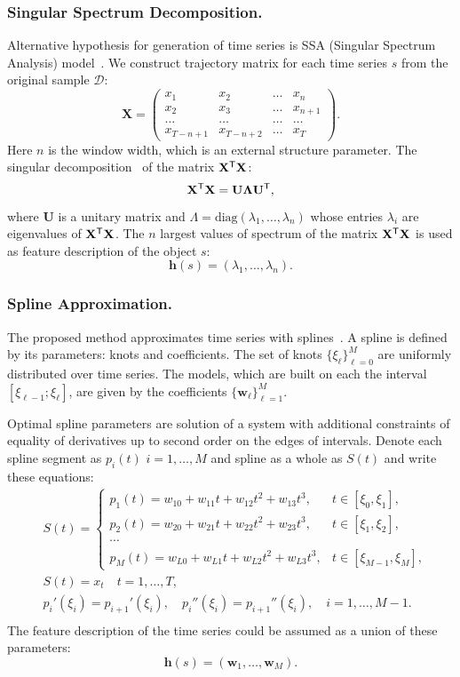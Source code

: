 \documentclass{llncs}
\newcommand{\T}{{\mbox{\scriptsize\sffamily\upshape\mdseries T}}}
\begin{document}
\subsubsection{Singular Spectrum Decomposition.}
Alternative hypothesis for generation of time series is SSA (Singular Spectrum Analysis) model~\cite{hassani2007singular}. We construct trajectory matrix for each time series $s$ from the original sample $\mathcal{D}$:
\[
\mathbf{X} = 
\begin{pmatrix}
x_1 & x_2 & \dots & x_n \\
x_2 & x_3 & \dots & x_{n+1} \\
\dots & \dots & \dots & \dots \\
x_{T-n+1} & x_{T-n+2} & \dots & x_T
\end{pmatrix}.
\]
Here $n$ is the window width, which is an external structure parameter.
The singular decomposition~\cite{golub1970singular} of the matrix $\mathbf{X}^{\T} \mathbf{X}$:
\[
\mathbf{X}^{\T} \mathbf{X} = \mathbf{U} \mathbf{\Lambda} \mathbf{U}^{\T},
\]
where $\mathbf{U}$ is a unitary matrix and $\Lambda = \mathrm{diag}(\lambda_1, \dots, \lambda_n)$ whose entries $\lambda_i$ are eigenvalues of $\mathbf{X}^{\T} \mathbf{X}$. 
The $n$ largest values of spectrum of the matrix $\mathbf{X}^{\T} \mathbf{X}$ is used as feature description of the object $s$:
\[
\bm{h}(s) = (\lambda_1, \dots, \lambda_n).
\]
\subsubsection{Spline Approximation.}
The proposed method approximates time series with splines~\cite{deboor1978splines}. A spline is defined by its parameters: knots and coefficients.
The set of knots $\{\xi_\ell\}_{\ell=0}^M$ are uniformly distributed over time series.
The models, which are built on each the interval $[\xi_{\ell-1}; \xi_{\ell}]$, are given by the coefficients $\{\mathbf{w}_\ell\}_{\ell=1}^{M}$.

Optimal spline parameters are solution of a system with additional constraints of equality of derivatives up to second order on the edges of intervals. Denote each spline segment as $p_i(t)$ $i = 1, \dots, M$ and spline as a whole as $S(t)$ and write these equations:
\begin{align*}
&S(t) = \begin{cases}
p_1(t) = w_{10} +w_{11}t + w_{12}t^2 + w_{13}t^3, & t\in [\xi_0, \xi_1],\\
p_2(t) = w_{20} +w_{21}t + w_{22}t^2 + w_{23}t^3, & t\in [\xi_1, \xi_2],\\
\cdots &\\
p_{M}(t) = w_{L0} +w_{L1}t + w_{L2}t^2 + w_{L3}t^3, & t\in [\xi_{M-1}, \xi_M],					
\end{cases}\\
&S(t) = x_t \quad t = 1, \dots, T,\\
&p_i'(\xi_i) = p_{i+1}'(\xi_i), \quad p_i''(\xi_i) = p_{i+1}''(\xi_i), \quad i = 1, \dots, M-1.\\
\end{align*}
The feature description of the time series could be assumed as a union of these parameters:
\[
\bm{h}(s) = (\mathbf{w}_1, \dots, \mathbf{w}_{M}).
\]
\end{document}
